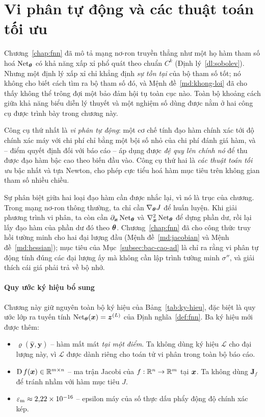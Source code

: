 \chapter{Vi phân tự động và các thuật toán tối ưu}
\label{chap:autodiff}
 
Chương~\ref{chap:fnn} đã mô tả mạng nơ-ron truyền thẳng như một họ hàm tham số
hoá $\operatorname{Net}_{\bm{\theta}}$ có khả năng xấp xỉ phổ quát theo chuẩn $C^k$
(Định lý~\ref{dl:sobolev}). Nhưng một định lý xấp xỉ chỉ khẳng định \emph{sự tồn
tại} của bộ tham số tốt; nó không cho biết cách tìm ra bộ tham số đó, và
Mệnh đề~\ref{md:khong-loi} đã cho thấy không thể trông đợi một bảo đảm hội tụ
toàn cục nào. Toàn bộ khoảng cách giữa khả năng biểu diễn lý thuyết và một
nghiệm số dùng được nằm ở hai công cụ được trình bày trong chương này.
 
Công cụ thứ nhất là \emph{vi phân tự động}: một cơ chế tính đạo hàm chính xác
tới độ chính xác máy với chi phí chỉ bằng một bội số nhỏ của chi phí đánh giá
hàm, và -- điểm quyết định đối với báo cáo -- áp dụng được \emph{đệ quy lên
chính nó} để thu được đạo hàm bậc cao theo biến đầu vào. Công cụ thứ hai là
\emph{các thuật toán tối ưu} bậc nhất và tựa Newton, cho phép cực tiểu hoá hàm
mục tiêu trên không gian tham số nhiều chiều.
 
Sự phân biệt giữa hai loại đạo hàm cần được nhắc lại, vì nó là trục của chương.
Trong mạng nơ-ron thông thường, ta chỉ cần $\nabla_{\bm{\theta}} J$ để huấn luyện.
Khi giải phương trình vi phân, ta còn cần $\partial_{\bm{x}}\operatorname{Net}_{\bm{\theta}}$ và
$\nabla^2_{\bm{x}}\operatorname{Net}_{\bm{\theta}}$ để dựng phần dư, rồi lại lấy đạo hàm của phần dư
đó theo $\bm{\theta}$. Chương~\ref{chap:fnn} đã cho công thức truy hồi tường minh cho
hai đại lượng đầu (Mệnh đề~\ref{md:jacobian} và Mệnh đề~\ref{md:hessian}); mục
tiêu của Mục~\ref{subsec:bac-cao-ad} là chỉ ra rằng vi phân tự động tính đúng các
đại lượng ấy mà không cần lập trình tường minh $\sigma''$, và giải thích cái giá
phải trả về bộ nhớ.
 
\subsubsection*{Quy ước ký hiệu bổ sung}
 
Chương này giữ nguyên toàn bộ ký hiệu của Bảng~\ref{tab:ky-hieu}, đặc biệt là
quy ước lớp ra tuyến tính $\operatorname{Net}_{\bm{\theta}}(\bm{x}) = \bm{z}^{(L)}$ của
Định nghĩa~\ref{def:fnn}. Ba ký hiệu mới được thêm:
 
\begin{itemize}[leftmargin=*]
\item $\varrho(\hat{\bm{y}}, \bm{y})$ -- hàm mất mát \emph{tại một điểm}. Ta
      không dùng ký hiệu $\mathcal{L}$ cho đại lượng này, vì $\mathcal{L}$ được
      dành riêng cho toán tử vi phân trong toàn bộ báo cáo.
\item $\operatorname{D} f(\bm{x}) \in \mathbb{R}^{m\times n}$ -- ma trận Jacobi của
      $f:\mathbb{R}^n\to\mathbb{R}^m$ tại $\bm{x}$. Ta không dùng $\bm{J}_f$ để tránh nhầm với hàm
      mục tiêu $J$.
\item $\varepsilon_{\mathrm{m}} \approx 2{,}22\times 10^{-16}$ -- epsilon máy của số thực dấu phẩy
      động độ chính xác kép.
\end{itemize}
 
